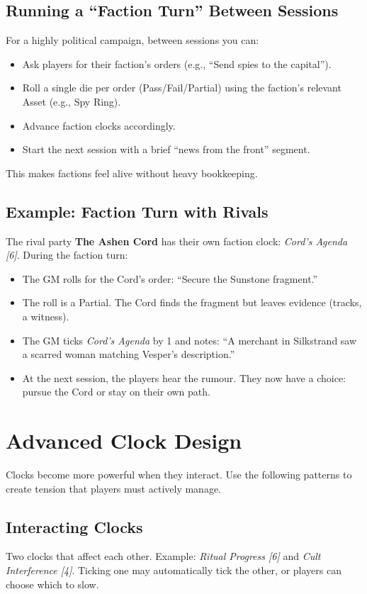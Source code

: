 \subsection*{Running a “Faction Turn” Between Sessions}
\label{subsec:faction-turn}
For a highly political campaign, between sessions you can:
\begin{itemize}
  \item Ask players for their faction’s orders (e.g., “Send spies to the capital”).
  \item Roll a single die per order (Pass/Fail/Partial) using the faction’s relevant Asset (e.g., Spy Ring).
  \item Advance faction clocks accordingly.
  \item Start the next session with a brief “news from the front” segment.
\end{itemize}
This makes factions feel alive without heavy bookkeeping.

\subsection*{Example: Faction Turn with Rivals}
The rival party \textbf{The Ashen Cord} has their own faction clock: \emph{Cord’s Agenda [6]}. During the faction turn:
\begin{itemize}
  \item The GM rolls for the Cord’s order: “Secure the Sunstone fragment.”
  \item The roll is a Partial. The Cord finds the fragment but leaves evidence (tracks, a witness).
  \item The GM ticks \emph{Cord’s Agenda} by 1 and notes: “A merchant in Silkstrand saw a scarred woman matching Vesper’s description.”
  \item At the next session, the players hear the rumour. They now have a choice: pursue the Cord or stay on their own path.
\end{itemize}

\section{Advanced Clock Design}

Clocks become more powerful when they interact. Use the following patterns to create tension that players must actively manage.

\subsection*{Interacting Clocks}
Two clocks that affect each other. Example: \emph{Ritual Progress [6]} and \emph{Cult Interference [4]}. Ticking one may automatically tick the other, or players can choose which to slow.

